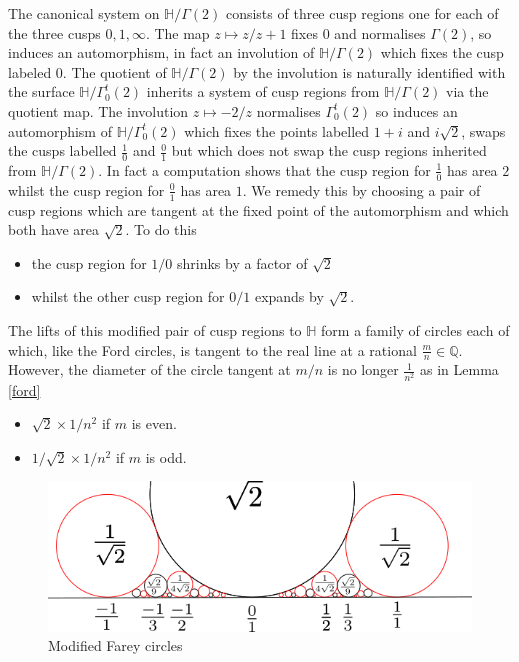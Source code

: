 \documentclass[12pt,a4paper]{amsart}
\def\HH{\mathbb{H}}
\def\g2{\Gamma(2)}
\def\ah{\Gamma_0^t(2)}
\def\oot{\HH / \ah}
\def\xx{\HH/\g2}
\begin{document}
The canonical system on $\xx$ consists of three cusp regions 
one for each of the three cusps $0,1,\infty$.
The map $z\mapsto z/z+1$ fixes $0$ and normalises $\g2$,
so induces an automorphism, in fact an involution of $\xx$ which
fixes the cusp labeled $0$.
The quotient of $\xx$ by the involution is naturally identified with
the surface $\oot$
inherits a system of cusp regions from $\xx$ via the quotient map.
The involution $z\mapsto -2/z$ normalises $\ah$ so induces an
automorphism of $\oot$ which fixes the points labelled
$1+i$ and $i\sqrt 2$, swaps the cusps labelled
$\frac{1}{0}$ and
$\frac{0}{1}$ but which does not swap the cusp regions inherited
from $\xx$.
In fact a computation shows that the cusp region for $\frac{1}{0}$ has
area $2$ whilst the cusp region for $\frac{0}{1}$ has area $1$.
We remedy this by choosing a pair of cusp regions which are tangent
at the fixed point of the automorphism and which both have area $\sqrt 2$.
To do this 
\begin{itemize}
\item the cusp region for $1/0$ shrinks by a factor of
$\sqrt 2$ 
\item whilst the other cusp region for $0/1$ expands by $\sqrt 2$.
\end{itemize}
The lifts of this modified pair of cusp regions to $\HH$ form a family of circles each of which, like the Ford
circles, is tangent to the real line at a rational
$\frac{m}{n}\in \mathbb{Q}$.
However, the diameter of the circle tangent at $m/n$ is no longer
$\frac{1}{n^2}$ as in Lemma \ref{ford}

\begin{itemize}
	\item $\sqrt 2 \times 1/ n^2$ if $m$ is even.
	\item $1/\sqrt 2 \times 1 / n^2$ if $m$ is odd.
\end{itemize}

 \begin{figure}[H]
\begin{center}
\includegraphics[scale=1]{farey_mod.png} 
\end{center}
\caption{Modified Farey circles}
\label{modified farey}
\end{figure}
\end{document}
